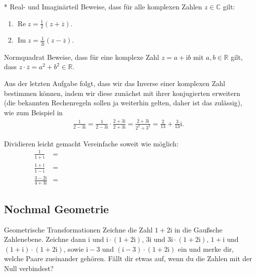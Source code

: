 \documentclass{zirkelblatt1415}
\newcommand{\RR}{\mathbb{R}}
\newcommand{\CC}{\mathbb{C}}
\newcommand{\ii}{\mathrm{i}}
\renewcommand{\Re}{\operatorname{Re}}
\renewcommand{\Im}{\operatorname{Im}}
\newcommand{\ol}[1]{\overline{#1}}
\begin{document}

\begin{aufgabe}{* Real- und Imaginärteil}
Beweise, dass für alle komplexen Zahlen $z\in\CC$ gilt:
\begin{enumerate}
  \item $\Re z=\frac{1}{2}(z+\ol{z})$.
  \item $\Im z=\frac{1}{2\ii}(z-\ol{z})$.
\end{enumerate}
\end{aufgabe}





\begin{aufgabe}{Normquadrat}
  Beweise, dass für eine komplexe Zahl $z=a+\ii b$ mit $a,b\in\RR$ gilt, dass $z\cdot\ol{z}=a^2+b^2\in\RR$.
\end{aufgabe}


Aus der letzten Aufgabe folgt, dass wir das Inverse einer komplexen Zahl bestimmen können, indem wir diese zunächst mit ihrer konjugierten erweitern (die bekannten Rechenregeln sollen ja weiterhin gelten, daher ist das zulässig), wie zum Beispiel in
\begin{align*}
\frac{1}{2-3\ii}=\frac{1}{2-3\ii}\cdot\frac{2+3\ii}{2+3\ii}=\frac{2+3\ii}{2^2+3^2}=\frac{2}{13}+\frac{3}{13}\ii.
\end{align*}

\begin{aufgabe}{Dividieren leicht gemacht}
  Vereinfache soweit wie möglich:
  \begin{align*}
    \frac{1}{1+\ii}&= \hspace{10cm}\\[0.4em]
    \frac{1+\ii}{1-\ii}&= \\[0.4em]
    \frac{3-2\ii}{4+3\ii}&=
  \end{align*}
\end{aufgabe}

\subsection{Nochmal Geometrie}

\begin{aufgabe}{Geometrische Transformationen}
  Zeichne die Zahl $1+2\ii$ in die Gaußsche Zahlenebene. Zeichne dann $\ii$ und $\ii\cdot(1+2\ii)$, $3\ii$ und $3\ii\cdot(1+2\ii)$, $1+\ii$ und $(1+\ii)\cdot(1+2\ii)$, sowie $\ii-3$ und $(\ii-3)\cdot(1+2\ii)$ ein und merke dir, welche Paare zueinander gehören. Fällt dir etwas auf, wenn du die Zahlen mit der Null verbindest?
\end{aufgabe}
\end{document}
